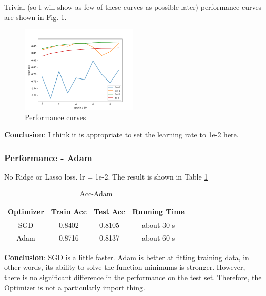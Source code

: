 \documentclass{article}
\begin{document}
Trivial (so I will show as few of these curves as possible later) performance curves are shown in Fig. \ref{performancecurve}.
\begin{figure}[H]
    \centering
    \includegraphics[width=0.5\textwidth]{fig/4-5.png}
    \caption{Performance curves}
    \label{performancecurve}
\end{figure}
\noindent \textbf{Conclusion}: I think it is appropriate to set the learning rate to 1e-2 here.
\subsubsection{Performance - Adam}
No Ridge or Lasso loss. lr = 1e-2. The result is shown in Table \ref{lraccadam}
\begin{table}[H]
    \centering
    \caption {Acc-Adam}
    \label {lraccadam}
    \begin{tabular}{c|c|c|c}
        \hline 
        Optimizer & Train Acc & Test Acc & Running Time\\
        \hline
        SGD & 0.8402 & 0.8105 & about 30 s\\
        Adam & 0.8716 & 0.8137 & about 60 s\\
        \hline
    \end{tabular}
\end{table}
\noindent \textbf{Conclusion}: SGD is a little faster. Adam is better at fitting training data, in other words, its ability to solve the function minimums is stronger. However, there is no significant difference in the performance on the test set.
Therefore, the Optimizer is not a particularly import thing.
\end{document}
